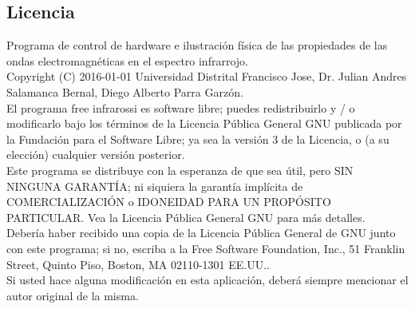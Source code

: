 \documentclass[12]{article}
\begin{document}
\begin{multicols}{2}
\subsection{Licencia}
Programa de control de hardware e ilustración física de las propiedades de las ondas electromagnéticas en el espectro infrarrojo.\\
Copyright (C) 2016-01-01  Universidad Distrital Francisco Jose, Dr. Julian Andres Salamanca Bernal, Diego Alberto Parra Garzón. \\
El programa free infrarossi es software libre; puedes redistribuirlo y / o modificarlo bajo los términos de la Licencia Pública General GNU publicada por la Fundación para el Software Libre; ya sea 	la versión 3 de la Licencia, o (a su elección) cualquier versión posterior. \\
Este programa se distribuye con la esperanza de que sea útil, pero SIN NINGUNA GARANTÍA; ni siquiera la garantía implícita de COMERCIALIZACIÓN o IDONEIDAD PARA UN PROPÓSITO PARTICULAR. Vea la Licencia Pública General GNU para más detalles. \\
Debería haber recibido una copia de la Licencia Pública General de GNU junto con este programa; si no, escriba a la Free Software Foundation, Inc., 51 Franklin Street, Quinto Piso, Boston, MA 02110-1301 EE.UU..\\
Si usted hace alguna modificación en esta aplicación, deberá siempre mencionar el autor original de la misma.


\end{multicols}
\end{document}
